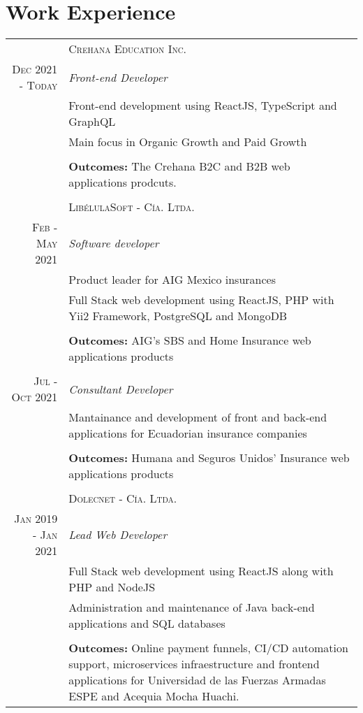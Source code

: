 \documentclass[a4paper,10.9pt]{article}
\begin{document}
\section{Work Experience}
\begin{tabular}{r|p{11cm}}
&\textsc{Crehana Education Inc.} \\
\textsc{Dec 2021 - Today}&\emph{Front-end Developer}\\
&\footnotesize{Front-end development using ReactJS, TypeScript and GraphQL}\\
&\footnotesize{Main focus in Organic Growth and Paid Growth}\\
&\\
&\footnotesize{\textbf{Outcomes:} The Crehana B2C and B2B web applications prodcuts.}\\
\multicolumn{2}{c}{} \\ 
 &\textsc{LibélulaSoft - Cía. Ltda.} \\
\textsc{Feb - May 2021}&\emph{Software developer}\\
&\footnotesize{Product leader for AIG Mexico insurances}
\\
&\footnotesize{Full Stack web development using ReactJS, PHP with Yii2 Framework, PostgreSQL and MongoDB}\\
&\\
&\footnotesize{\textbf{Outcomes:} AIG's SBS and Home Insurance web applications products}\\
\\
\textsc{Jul - Oct 2021}&\emph{Consultant Developer}\\
&\footnotesize{Mantainance and development of front and back-end applications for Ecuadorian insurance companies}\\
&\\
&\footnotesize{\textbf{Outcomes:} Humana and Seguros Unidos' Insurance web applications products}\\
\multicolumn{2}{c}{} \\ 
 &\textsc{Dolecnet - Cía. Ltda.} \\
\textsc{Jan 2019 - Jan 2021} &\emph{Lead Web Developer}\\&\footnotesize{Full Stack web development using ReactJS along with PHP and NodeJS}
\\&\footnotesize{Administration and maintenance of Java back-end applications and SQL databases}\\
&\\
&\footnotesize{\textbf{Outcomes:} Online payment funnels, CI/CD automation support, microservices infraestructure and frontend applications for Universidad de las Fuerzas Armadas ESPE and Acequia Mocha Huachi.}\\
\end{tabular}
\end{document}
